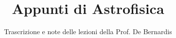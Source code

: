 \documentclass[a4paper,12pt]{article}
\title{Appunti di Astrofisica}
\author{Trascrizione e note delle lezioni della Prof. De Bernardis}
\date{}
\begin{document}
\maketitle
\projectintro
\tableofcontents
\newpage

\end{document}
